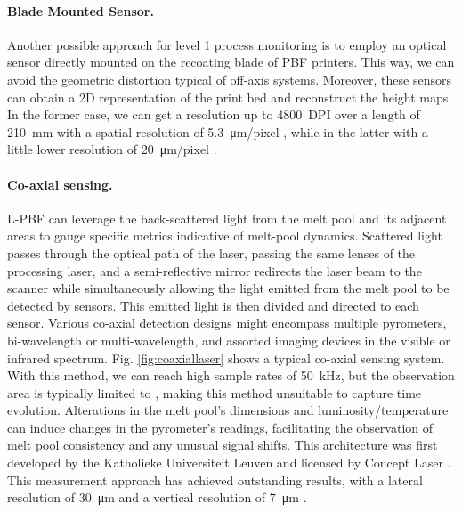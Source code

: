 \paragraph{Blade Mounted Sensor.} Another possible approach for level 1 process monitoring is to employ an optical sensor directly mounted on the recoating blade of PBF printers. This way, we can avoid the geometric distortion typical of off-axis systems. Moreover, these sensors can obtain a 2D representation of the print bed and reconstruct the height maps. In the former case, we can get a resolution up to \SI{4800}{DPI} over a length of \SI{210}{\milli\metre} with a spatial resolution of \SI{5.3}{\micro\metre / pixel} \cite{tan_phuc_high-resolution_2019}, while in the latter with a little lower resolution of \SI{20}{\micro\metre / pixel} \cite{barrett_micron-level_2018}.
\paragraph{Co-axial sensing.} L-PBF can leverage the back-scattered light from the melt pool and its adjacent areas to gauge specific metrics indicative of melt-pool dynamics. Scattered light passes through the optical path of the laser, passing the same lenses of the processing laser, and a semi-reflective mirror redirects the laser beam to the scanner while simultaneously allowing the light emitted from the melt pool to be detected by sensors. This emitted light is then divided and directed to each sensor. Various co-axial detection designs might encompass multiple pyrometers, bi-wavelength or multi-wavelength, and assorted imaging devices in the visible or infrared spectrum. Fig. \ref{fig:coaxiallaser} shows a typical co-axial sensing system. With this method, we can reach high sample rates of \SI{50}{\kilo\hertz}, but the observation area is typically limited to , making this method unsuitable to capture time evolution. Alterations in the melt pool's dimensions and luminosity/temperature can induce changes in the pyrometer's readings, facilitating the observation of melt pool consistency and any unusual signal shifts. This architecture was first developed by the Katholieke Universiteit Leuven and licensed by Concept Laser \cite{colosimo_-machine_2020, kruth_jean-pierre_feedback_2007, berumen_quality_2010}. This measurement approach has achieved outstanding results, with a lateral resolution of \SI{30}{\micro\metre} and a vertical resolution of \SI{7}{\micro\metre} \cite{fleming_tracking_2020}.
